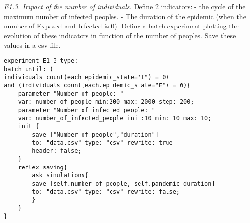 \documentclass{article}
\begin{document}
\underline{\textit{E1.3. Impact of the number of individuals.}}
Define 2 indicators:
- the cycle of the maximum number of infected peoples.
- The duration of the epidemic (when the number of Exposed and Infected is
0).
Define a batch experiment plotting the evolution of these indicators in function
of the number of peoples. Save these values in a csv file.
\newline\newline
\begin{tcolorbox}
\begin{lstlisting}
experiment E1_3 type: 
batch until: (
individuals count(each.epidemic_state="I") = 0) 
and (individuals count(each.epidemic_state="E") = 0){
	parameter "Number of people: " 
	var: number_of_people min:200 max: 2000 step: 200;
	parameter "Number of infected people: " 
	var: number_of_infected_people init:10 min: 10 max: 10;
	init {
		save ["Number of people","duration"] 
		to: "data.csv" type: "csv" rewrite: true 
		header: false;
	}
	reflex saving{
		ask simulations{
		save [self.number_of_people, self.pandemic_duration] 
		to: "data.csv" type: "csv" rewrite: false;
		}
	}
}
\end{lstlisting}
\end{tcolorbox}
\end{document}
